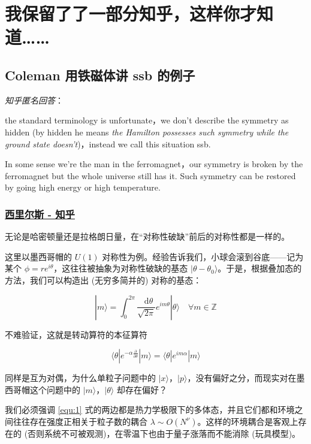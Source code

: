 \documentclass[oneside,a4paper,openany,11pt]{ctexbook}
\newcommand*{\dif}{\mathop{}\!\mathrm{d}} %
\begin{document}
\chapter{我保留了了一部分知乎，这样你才知道……}

\section{Coleman 用铁磁体讲 ssb 的例子}

\emph{知乎匿名回答}：

the standard terminology is unfortunate，we don't describe the symmetry as hidden (by hidden he means \emph{the Hamilton possesses such symmetry while the ground state doesn't})，instead we call this situation ssb.

In some sense we're the man in the ferromagnet，our symmetry is broken by the ferromagnet but the whole universe still has it. Such symmetry can be restored by going high energy or high temperature.

\subsection{\href{https://www.zhihu.com/people/imserious}{西里尔斯 - 知乎}}

无论是哈密顿量还是拉格朗日量，在“对称性破缺”前后的对称性都是一样的。

这里以墨西哥帽的 $U(1)$ 对称性为例。经验告诉我们，小球会滚到谷底——记为某个 $\phi=r e^{i \theta}$，这往往被抽象为对称性破缺的基态 $|\theta-\theta_0\rangle$。于是，根据叠加态的方法，我们可以构造出 (无穷多简并的) 对称的基态：

\begin{equation}
    |m\rangle = \int_0^{2\pi} \frac{\dif \theta}{\sqrt{2\pi}} e^{im \theta} |\theta\rangle \quad \forall m \in \mathbb{Z}
    \label{equ:1}
\end{equation}

不难验证，这就是转动算符的本征算符

\begin{equation*}
    \langle\theta| e^{-\alpha \frac{\partial}{\partial \theta}} |m\rangle = \langle\theta| e^{im\alpha} |m\rangle
\end{equation*}

同样是互为对偶，为什么单粒子问题中的 $|x\rangle，|p\rangle$，没有偏好之分，而现实对在墨西哥帽这个问题中的 $|m\rangle，|\theta\rangle$ 却存在偏好？

我们必须强调 \eqref{equ:1} 式的两边都是热力学极限下的多体态，并且它们都和环境之间往往存在强度正相关于粒子数的耦合 $\lambda \sim O(N^\nu)$。这样的环境耦合是客观上存在的 (否则系统不可被观测)，在零温下也由于量子涨落而不能消除 (玩具模型)。
\end{document}
